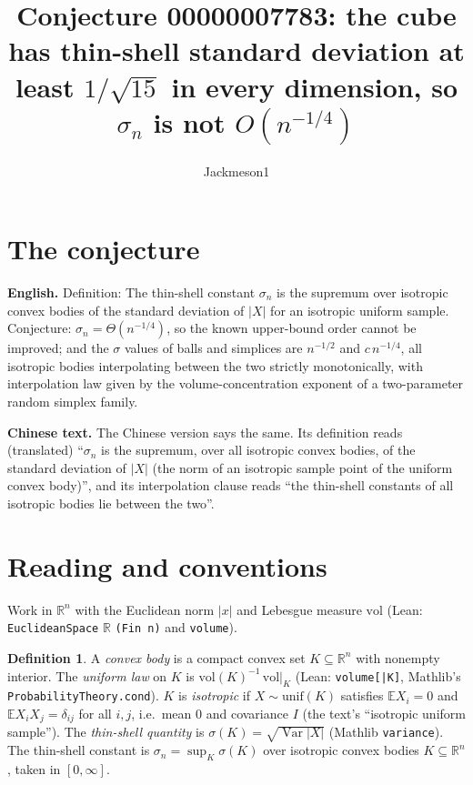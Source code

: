\documentclass[11pt]{article}
\title{Conjecture 00000007783: the cube has thin-shell standard deviation at least $1/\sqrt{15}$ in every dimension, so $\sigma_n$ is not $O(n^{-1/4})$}
\author{Jackmeson1}
\date{}
\theoremstyle{definition}
\newtheorem{definition}[theorem]{Definition}
\theoremstyle{remark}
\begin{document}
\maketitle

\section{The conjecture}

\textbf{English.} Definition: The thin-shell constant $\sigma_n$ is the supremum over isotropic
convex bodies of the standard deviation of $|X|$ for an isotropic uniform sample. Conjecture:
$\sigma_n = \Theta(n^{-1/4})$, so the known upper-bound order cannot be improved; and the $\sigma$
values of balls and simplices are $n^{-1/2}$ and $c\, n^{-1/4}$, all isotropic bodies interpolating
between the two strictly monotonically, with interpolation law given by the volume-concentration
exponent of a two-parameter random simplex family.

\textbf{Chinese text.} The Chinese version says the same. Its definition reads (translated)
``$\sigma_n$ is the supremum, over all isotropic convex bodies, of the standard deviation of $|X|$
(the norm of an isotropic sample point of the uniform convex body)'', and its interpolation clause
reads ``the thin-shell constants of all isotropic bodies lie between the two''.

\section{Reading and conventions}

Work in $\mathbb R^n$ with the Euclidean norm $|x|$ and Lebesgue measure $\mathrm{vol}$
(Lean: \texttt{EuclideanSpace} $\mathbb R$ \texttt{(Fin n)} and \texttt{volume}).

\begin{definition}
A \emph{convex body} is a compact convex set $K\subseteq\mathbb R^n$ with nonempty interior. The
\emph{uniform law} on $K$ is $\mathrm{vol}(K)^{-1}\,\mathrm{vol}|_K$ (Lean:
\texttt{volume[|K]}, Mathlib's \texttt{ProbabilityTheory.cond}). $K$ is \emph{isotropic} if
$X\sim\mathrm{unif}(K)$ satisfies $\mathbb E X_i=0$ and $\mathbb E X_iX_j=\delta_{ij}$ for all
$i,j$, i.e.\ mean $0$ and covariance $I$ (the text's ``isotropic uniform sample''). The
\emph{thin-shell quantity} is $\sigma(K)=\sqrt{\operatorname{Var}|X|}$ (Mathlib
\texttt{variance}). The thin-shell constant is $\sigma_n=\sup_K\sigma(K)$ over isotropic convex
bodies $K\subseteq\mathbb R^n$, taken in $[0,\infty]$.
\end{definition}
\end{document}
